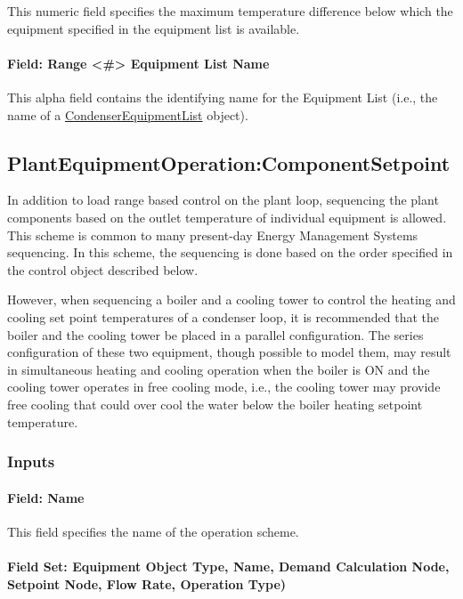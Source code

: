This numeric field specifies the maximum temperature difference below which the equipment specified in the equipment list is available.

\paragraph{Field: Range \textless{}\#\textgreater{} Equipment List Name}\label{field-range-equipment-list-name-2}

This alpha field contains the identifying name for the Equipment List (i.e., the name of a \hyperref[condenserequipmentlist]{CondenserEquipmentList} object).

\subsection{PlantEquipmentOperation:ComponentSetpoint}\label{plantequipmentoperationcomponentsetpoint}

In addition to load range based control on the plant loop, sequencing the plant components based on the outlet temperature of individual equipment is allowed. This scheme is common to many present-day Energy Management Systems sequencing. In this scheme, the sequencing is done based on the order specified in the control object described below.

However, when sequencing a boiler and a cooling tower to control the heating and cooling set point temperatures of a condenser loop, it is recommended that the boiler and the cooling tower be placed in a parallel configuration. The series configuration of these two equipment, though possible to model them, may result in simultaneous heating and cooling operation when the boiler is ON and the cooling tower operates in free cooling mode, i.e., 
the cooling tower may provide free cooling that could over cool the water below the boiler heating setpoint temperature.  


\subsubsection{Inputs}\label{inputs-12-011}

\paragraph{Field: Name}\label{field-name-6-014}

This field specifies the name of the operation scheme.

\paragraph{Field Set: Equipment Object Type, Name, Demand Calculation Node, Setpoint Node, Flow Rate, Operation Type)}\label{field-set-equipment-object-type-name-demand-calculation-node-setpoint-node-flow-rate-operation-type}


